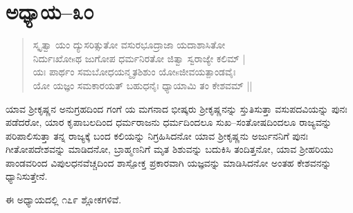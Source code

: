 \section{ಅಧ್ಯಾಯ–೩೦}

\begin{verse}
ಸ್ಕೃತ್ವಾ ಯಂ ದ್ಯುಸರಿತ್ಸುತೋ ವಸುರಭೂದ್ರಾಜಾ ಯದಾಶಾಸಿತೋ\\ ನಿರ್ದುಃಖೋsಥ ಜುಗೋಪ ಧರ್ಮನಿರತೋ ಜಿತ್ವಾ ಸ್ವರಾಜ್ಯೇ ಕಲಿಮ್ |\\ ಯಃ ಪಾರ್ಥಂ ಸಮಬೋಧಯನ್ಮೃತಶಿಶುಂ ಯೋsಜೀವಯತ್ಪಾಂಡವೈಃ\\ ಯೋ ಯಜ್ಞಂ ಸಮಕಾರಯತ್‌ ಬಹುಧನೈಃ ಧ್ಯಾಯಾಮಿ ತಂ ಕೇಶವಮ್ ||
\end{verse}

ಯಾವ ಶ‍್ರೀಕೃಷ್ಣನ ಅನುಗ್ರಹದಿಂದ ಗಂಗೆ ಯ ಮಗನಾದ ಭೀಷ್ಕರು ಶ‍್ರೀಕೃಷ್ಣನನ್ನು ಸ್ತುತಿಸುತ್ತಾ ವಸುಪದವಿಯನ್ನು ಪುನಃ ಪಡೆದರೋ, ಯಾರ ಕೃಪಾಬಲದಿಂದ ಧರ್ಮರಾಜನು ಧರ್ಮದಿಂದಲೂ ಸುಖ–ಸಂತೋಷದಿಂದಲೂ ರಾಜ್ಯವನ್ನು ಪರಿಪಾಲಿಸುತ್ತಾ ತನ್ನ ರಾಜ್ಯಕ್ಕೆ ಬಂದ ಕಲಿಯನ್ನು ನಿಗ್ರಹಿಸಿದನೋ ಯಾವ ಶ‍್ರೀಕೃಷ್ಣನು ಅರ್ಜುನನಿಗೆ ಪುನಃ ಗೀತೋಪದೇಶವನ್ನು ಮಾಡಿದನೋ, ಬ್ರಾಹ್ಮಣನಿಗೆ ಮೃತ ಶಿಶುವನ್ನು ಬದುಕಿಸಿ ತಂದಿತ್ತನೋ, ಯಾವ ಶ‍್ರೀಹರಿಯು ಪಾಂಡವರಿಂದ ವಿಪುಲಧನವೆಚ್ಚದಿಂದ ಶಾಸ್ಪೋಕ್ತ ಪ್ರಕಾರವಾಗಿ ಯಜ್ಞವನ್ನು ಮಾಡಿಸಿದನೋ ಅಂತಹ ಕೇಶವನನ್ನು ಧ್ಯಾನಿಸುತ್ತೇನೆ.

ಈ ಅಧ್ಯಾಯದಲ್ಲಿ ೧೭೯ ಶ್ಲೋಕಗಳಿವೆ.

